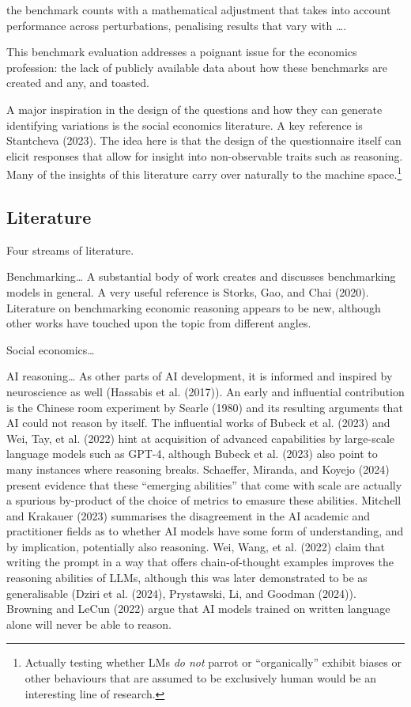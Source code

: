 \documentclass[
]{article}
\begin{document}
the benchmark counts with a mathematical adjustment that takes into
account performance across perturbations, penalising results that vary
with \ldots.

This benchmark evaluation addresses a poignant issue for the economics
profession: the lack of publicly available data about how these
benchmarks are created and any, and toasted.

A major inspiration in the design of the questions and how they can
generate identifying variations is the social economics literature. A
key reference is Stantcheva (2023). The idea here is that the design of
the questionnaire itself can elicit responses that allow for insight
into non-observable traits such as reasoning. Many of the insights of
this literature carry over naturally to the machine space.\footnote{Actually
  testing whether LMs \emph{do not} parrot or ``organically'' exhibit
  biases or other behaviours that are assumed to be exclusively human
  would be an interesting line of research.}

\subsection{Literature}\label{literature}

Four streams of literature.

Benchmarking\ldots{} A substantial body of work creates and discusses
benchmarking models in general. A very useful reference is Storks, Gao,
and Chai (2020). Literature on benchmarking economic reasoning appears
to be new, although other works have touched upon the topic from
different angles.

Social economics\ldots{}

AI reasoning\ldots{} As other parts of AI development, it is informed
and inspired by neuroscience as well (Hassabis et al. (2017)). An early
and influential contribution is the Chinese room experiment by Searle
(1980) and its resulting arguments that AI could not reason by itself.
The influential works of Bubeck et al. (2023) and Wei, Tay, et al.
(2022) hint at acquisition of advanced capabilities by large-scale
language models such as GPT-4, although Bubeck et al. (2023) also point
to many instances where reasoning breaks. Schaeffer, Miranda, and Koyejo
(2024) present evidence that these ``emerging abilities'' that come with
scale are actually a spurious by-product of the choice of metrics to
emasure these abilities. Mitchell and Krakauer (2023) summarises the
disagreement in the AI academic and practitioner fields as to whether AI
models have some form of understanding, and by implication, potentially
also reasoning. Wei, Wang, et al. (2022) claim that writing the prompt
in a way that offers chain-of-thought examples improves the reasoning
abilities of LLMs, although this was later demonstrated to be as
generalisable (Dziri et al. (2024), Prystawski, Li, and Goodman (2024)).
Browning and LeCun (2022) argue that AI models trained on written
language alone will never be able to reason.
\end{document}
